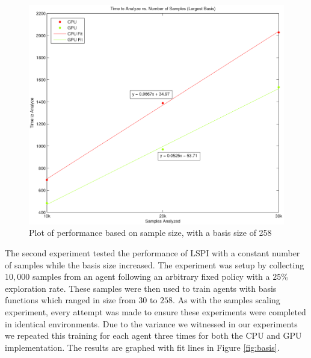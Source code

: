 \begin{figure}%
    \centering
    \includegraphics[height=0.4\paperheight]{Large_Time_vs_Samples.png}%
    \caption{Plot of performance based on sample size, with a basis size of 258}%
    \label{fig:samples:large}%
\end{figure}

The second experiment tested the performance of LSPI with a constant number of samples while the basis size increased. The experiment was setup by collecting $10,000$ samples from an agent following an arbitrary fixed policy with a $25\%$ exploration rate. These samples were then used to train agents with basis functions which ranged in size from $30$ to $258$. As with the samples scaling experiment, every attempt was made to ensure these experiments were completed in identical environments. Due to the variance we witnessed in our experiments we repeated this training for each agent three times for both the CPU and GPU implementation. The results are graphed with fit lines in Figure \ref{fig:basis}.

